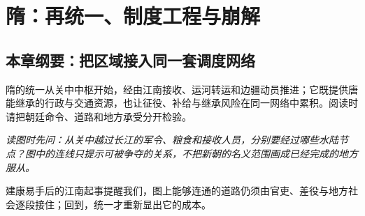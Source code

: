 \chapter{隋：再统一、制度工程与崩解}
\label{ch:sui}
\section{本章纲要：把区域接入同一套调度网络}
隋的统一从关中中枢开始，经由江南接收、运河转运和边疆动员推进；它既提供唐能继承的行政与交通资源，也让征役、补给与继承风险在同一网络中累积。阅读时请把朝廷命令、道路和地方承受分开检验。



\noindent\textit{读图时先问：从关中越过长江的军令、粮食和接收人员，分别要经过哪些水陆节点？图中的连线只提示可被争夺的关系，不把新朝的名义范围画成已经完成的地方服从。}

\noindent 建康易手后的江南起事提醒我们，图上能够连通的道路仍须由官吏、差役与地方社会逐段接住；回到，统一才重新显出它的成本。

